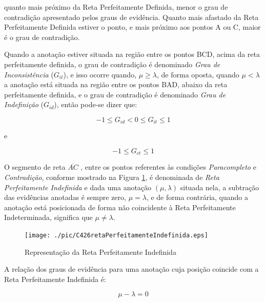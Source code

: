 quanto mais próximo da Reta Perfeitamente Definida, menor o grau de contradição apresentado pelos graus de evidência. 
Quanto mais afastado da Reta Perfeitamente Definida estiver o ponto, e mais próximo aos pontos A ou C, maior é o grau de contradição. 

Quando a anotação estiver situada na região entre os pontos BCD, acima da reta perfeitamente definida, o grau de contradição é denominado 
\emph{Grau de Inconsistência} ($G_{it}$), 
e isso ocorre quando, $\mu \ge \lambda $, de forma oposta, quando $\mu < \lambda $ a anotação está situada na região entre os pontos BAD, abaixo da reta perfeitamente definida, e o grau de contradição é denominado 
\emph{Grau de Indefinição} ($G_{id}$), 
então pode-se dizer que:

\begin{center}
\begin{equation}
-1 \le G _{id}  <  0 \le G _{it} \le 1
\label{eq:grauInconsistenciaIndefinicao}
\end{equation}
\end{center}
e
\begin{center}
\begin{equation}
-1 \le G _{ct} \le 1
\label{eq:grauInconsistenciaIndefinicao1}
\end{equation}
\end{center}


O segmento de reta $\overline{ AC }$ , entre os pontos referentes às condições \emph{Paracompleto} e \emph{Contradição}, conforme mostrado na Figura \ref{fig:retaPerfeitamenteIndefinida}, é denominada de \emph{Reta Perfeitamente Indefinida} e dada uma anotação $(\mu, \lambda )$ situada nela, a subtração das evidências anotadas é sempre zero, $\mu = \lambda$, e de forma contrária, quando a anotação está posicionada de forma não coincidente à Reta Perfeitamente Indeterminada, significa que $\mu \neq \lambda$.

\begin{figure}[!htb]
\center\texttt{[image: ./pic/C426retaPerfeitamenteIndefinida.eps]}
\caption{Representação da Reta Perfeitamente Indefinida}
\label{fig:retaPerfeitamenteIndefinida}
\end{figure}

A relação dos graus de evidência para uma anotação cuja posição coincide com a Reta Perfeitamente Indefinida é: 

\begin{center}
\begin{equation}
\mu - \lambda = 0
\label{eq:evidenciaIndefinida}
\end{equation}
\end{center}

